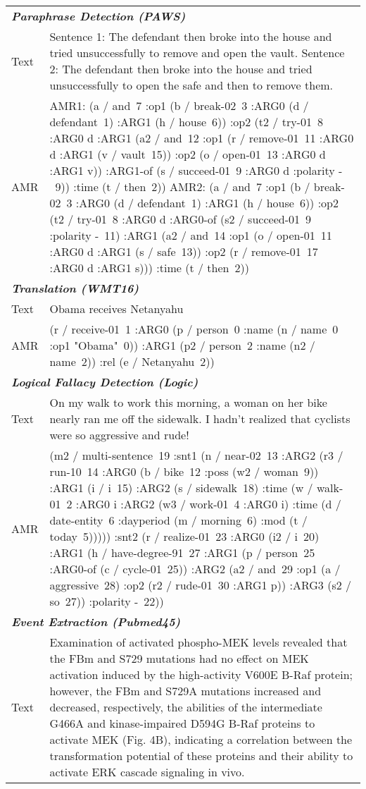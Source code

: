 \begin{enumerate}
{\begin{table}[ht]
\begin{tabular}{lp{6cm}}
\multicolumn{2}{l}{\textbf{\textit{Paraphrase Detection (PAWS)}}} \\
Text & Sentence 1: The defendant then broke into the house and tried unsuccessfully to remove and open the vault. \newline
Sentence 2: The defendant then broke into the house and tried unsuccessfully to open the safe and then to remove them.
\\
AMR & AMR1: (a / and~7 :op1 (b / break-02~3 :ARG0 (d / defendant~1) :ARG1 (h / house~6)) :op2 (t2 / try-01~8 :ARG0 d :ARG1 (a2 / and~12 :op1 (r / remove-01~11 :ARG0 d :ARG1 (v / vault~15)) :op2 (o / open-01~13 :ARG0 d :ARG1 v)) :ARG1-of (s / succeed-01~9 :ARG0 d :polarity -~9)) :time (t / then~2))  \newline
AMR2: (a / and~7 :op1 (b / break-02~3 :ARG0 (d / defendant~1) :ARG1 (h / house~6)) :op2 (t2 / try-01~8 :ARG0 d :ARG0-of (s2 / succeed-01~9 :polarity -~11) :ARG1 (a2 / and~14 :op1 (o / open-01~11 :ARG0 d :ARG1 (s / safe~13)) :op2 (r / remove-01~17 :ARG0 d :ARG1 s))) :time (t / then~2)) 
\\
\midrule
\multicolumn{2}{l}{\textbf{\textit{Translation (WMT16)}}}\\
Text & Obama receives Netanyahu
\\
AMR & (r / receive-01~1
    :ARG0 (p / person~0
        :name (n / name~0
            :op1 "Obama"~0))
    :ARG1 (p2 / person~2
        :name (n2 / name~2))
    :rel (e / Netanyahu~2))
\\
\midrule
\multicolumn{2}{l}{\textbf{\textit{Logical Fallacy Detection (Logic)}}}\\
Text & On my walk to work this morning, a woman on her bike nearly ran me off the sidewalk. I hadn't realized that cyclists were so aggressive and rude!
\\
AMR & (m2 / multi-sentence~19 :snt1 (n / near-02~13 :ARG2 (r3 / run-10~14 :ARG0 (b / bike~12 :poss (w2 / woman~9)) :ARG1 (i / i~15) :ARG2 (s / sidewalk~18) :time (w / walk-01~2 :ARG0 i :ARG2 (w3 / work-01~4 :ARG0 i) :time (d / date-entity~6 :dayperiod (m / morning~6) :mod (t / today~5))))) :snt2 (r / realize-01~23 :ARG0 (i2 / i~20) :ARG1 (h / have-degree-91~27 :ARG1 (p / person~25 :ARG0-of (c / cycle-01~25)) :ARG2 (a2 / and~29 :op1 (a / aggressive~28) :op2 (r2 / rude-01~30 :ARG1 p)) :ARG3 (s2 / so~27)) :polarity -~22)) 
\\
\midrule
\multicolumn{2}{l}{\textbf{\textit{Event Extraction (Pubmed45)}}}\\
Text & Examination of activated phospho-MEK levels revealed that the FBm and S729 mutations had no effect on MEK activation induced by the high-activity V600E B-Raf protein; however, the FBm and S729A mutations increased and decreased, respectively, the abilities of the intermediate G466A and kinase-impaired D594G B-Raf proteins to activate MEK (Fig. 4B), indicating a correlation between the transformation potential of these proteins and their ability to activate ERK cascade signaling in vivo.

\end{tabular}
\end{table}}
\end{enumerate}
